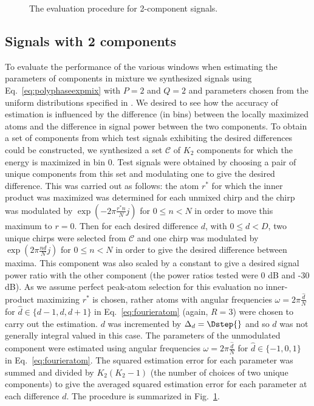 \documentclass[twoside,a4paper]{article}
\begin{document}
\begin{figure}[H]
    \caption{The evaluation procedure for 2-component
    signals.\label{fig:2cevalflowchart}}
\end{figure}

\subsection{Signals with 2 components}

To evaluate the performance of the various windows when estimating the
parameters of components in mixture we synthesized signals using
Eq.~\ref{eq:polyphaseexpmix} with $P=2$ and $Q=2$ and parameters chosen from the
uniform distributions specified in \cite{betser2009sinusoidal}.  We desired to
see how the accuracy of estimation is influenced by the difference (in bins)
between the locally maximized atoms and the difference in signal power between
the two components. To obtain a set of components from which test signals
exhibiting the desired differences could be constructed, we synthesized a set
$\mathcal{C}$ of $K_{2}$ components for which the energy is maximized in bin 0.
Test signals were obtained by choosing a pair of unique components from this set
and modulating one to give the desired difference.  This was carried out as
follows: the atom $r^{\ast}$ for which the inner product was maximized was
determined for each unmixed chirp and the chirp was modulated by $\exp(-2\pi
\frac{r^{\ast} n}{N}j)$ for $0 \leq n < N$ in order to move this maximum
to $r=0$. Then for each desired difference $d$, with $0 \leq d < D$, two unique
chirps were selected from $\mathcal{C}$ and one chirp was modulated by
$\exp(2\pi \frac{n d}{N}j)$ for $0 \leq n < N$ in order to give the
desired difference between maxima. This component was also scaled by a constant
to give a desired signal power ratio with the other component (the power ratios
tested were 0 dB and -30 dB). As we assume perfect peak-atom selection for this
evaluation no inner-product maximizing $r^{\ast}$ is chosen, rather atoms with
angular frequencies $\omega=2\pi\frac{\hat{d}}{N}$ for $\hat{d} \in
\{d-1,d,d+1\}$ in Eq.~\ref{eq:fourieratom} (again, $R=3$) were chosen to carry
out the estimation. $d$ was incremented by $\Delta_{d} = \Dstep{}$ and so
$\hat{d}$ was not generally integral valued in this case. The parameters of the
unmodulated component were estimated using angular frequencies
$\omega=2\pi\frac{\hat{d}}{N}$ for $\hat{d} \in\{-1,0,1\}$ in
Eq.~\ref{eq:fourieratom}. The squared
estimation error for each parameter was summed and divided by $K_{2}(K_{2}-1)$
(the number of choices of two unique components) to give the averaged squared
estimation error for each parameter at each difference $d$. The procedure is
summarized in Fig.~\ref{fig:2cevalflowchart}.
\end{document}
